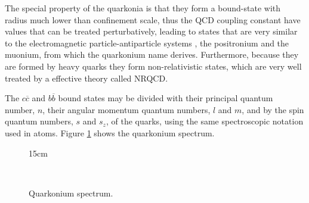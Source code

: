 The special property of the quarkonia is that they form a bound-state with radius much lower than confinement scale, thus the QCD coupling constant have values that can be treated perturbatively, leading to states that are very similar to the electromagnetic particle-antiparticle systems \cite{Burgess:2006hbd}, the positronium and the muonium, from which the quarkonium name derives. Furthermore, because they are formed by heavy quarks they form non-relativistic states, which are very well treated by a effective theory called NRQCD.

The $c\overline{c}$ and $b\overline{b}$ bound states may be divided with their principal quantum number, $n$, their angular momentum quantum numbers, $l$ and $m$, and by the spin quantum numbers, $s$ and $s_z$, of the quarks, using the same spectroscopic notation used in atoms. Figure \ref{fig:qq_spectrum} shows the quarkonium spectrum.

\begin{figure}[!htm]{15cm}
  \caption{Quarkonium spectrum.} 
  \label{fig:qq_spectrum}
  \hfill
  \\
\end{figure}

